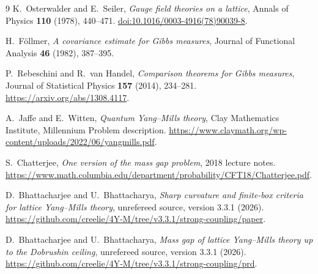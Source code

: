 \documentclass[11pt,a4paper]{article}
\numberwithin{equation}{section}
\begin{document}
\begin{thebibliography}{9}
\small
{}
K.~Osterwalder and E.~Seiler,
\emph{Gauge field theories on a lattice},
Annals of Physics \textbf{110} (1978), 440--471.
\href{https://doi.org/10.1016/0003-4916(78)90039-8}{doi:10.1016/0003-4916(78)90039-8}.

H.~F\"ollmer,
\emph{A covariance estimate for Gibbs measures},
Journal of Functional Analysis \textbf{46} (1982), 387--395.

P.~Rebeschini and R.~van Handel,
\emph{Comparison theorems for Gibbs measures},
Journal of Statistical Physics \textbf{157} (2014), 234--281.
\url{https://arxiv.org/abs/1308.4117}.

A.~Jaffe and E.~Witten,
\emph{Quantum Yang--Mills theory},
Clay Mathematics Institute, Millennium Problem description.
\url{https://www.claymath.org/wp-content/uploads/2022/06/yangmills.pdf}.

S.~Chatterjee,
\emph{One version of the mass gap problem},
2018 lecture notes.
\url{https://www.math.columbia.edu/department/probability/CFT18/Chatterjee.pdf}.

D.~Bhattacharjee and U.~Bhattacharya,
\emph{Sharp curvature and finite-box criteria for lattice
Yang--Mills theory}, unrefereed source, version 3.3.1 (2026).
\url{https://github.com/creelie/4Y-M/tree/v3.3.1/strong-coupling/paper}.

D.~Bhattacharjee and U.~Bhattacharya,
\emph{Mass gap of lattice Yang--Mills theory up to the
Dobrushin ceiling}, unrefereed source, version 3.3.1 (2026).
\url{https://github.com/creelie/4Y-M/tree/v3.3.1/strong-coupling/prd}.
\end{thebibliography}
\end{document}
